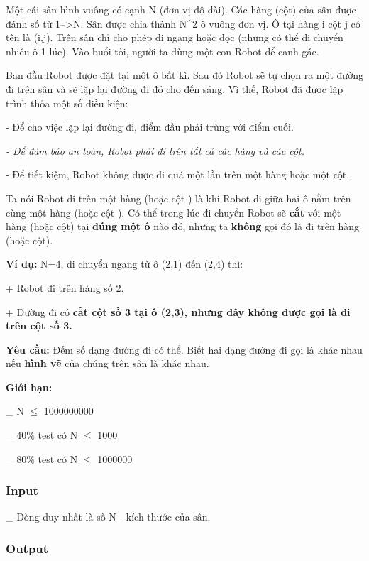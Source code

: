 



   Một cái sân hình vuông có cạnh N (đơn vị độ dài). Các hàng (cột) của sân được đánh số từ 1-->N. Sân được chia thành N^2 ô vuông đơn vị. Ô tại hàng i cột j có tên là (i,j). Trên sân chỉ cho phép đi ngang hoặc dọc (nhưng có thể di chuyển nhiều ô 1 lúc). Vào buổi tối, người ta dùng một con Robot để canh gác.  

   Ban đầu Robot được đặt tại một ô bất kì. Sau đó Robot sẽ tự chọn ra một đường đi trên sân và sẽ lặp lại đường đi đó cho đến sáng. Vì thế, Robot đã được lặp trình thỏa một số điều kiện:  

- Để cho việc lặp lại đường đi, điểm đầu phải trùng với điểm cuối.

\emph{    - Để đảm bảo an toàn, Robot phải đi trên tất cả các hàng và các cột.    
\\}

- Để tiết kiệm, Robot không được đi quá một lần trên một hàng hoặc một cột.

   Ta nói   Robot đi trên một hàng   (hoặc   cột   ) là khi Robot đi giữa   hai ô nằm trên cùng một hàng   (hoặc   cột   ). Có thể trong lúc đi chuyển Robot sẽ   \textbf{    cắt   }   với một hàng (hoặc cột) tại   \textbf{    đúng một ô   }   nào đó, nhưng ta   \textbf{    không   }   gọi đó là đi trên hàng (hoặc cột).  

\textbf{     Ví dụ:    }N=4, di chuyển ngang từ ô (2,1) đến (2,4) thì:

+ Robot đi trên hàng số 2.

+ Đường đi có    \textbf{     cắt    cột số 3 tại ô (2,3), nhưng đây    \textbf{     không    }    được gọi là đi trên cột số 3.   }

\textbf{      Yêu cầu:     }   Đếm số dạng đường đi có thể. Biết hai dạng đường đi gọi là khác nhau nếu   \textbf{    hình vẽ   }   của chúng trên sân là khác nhau.  

\textbf{      Giới hạn:     }

\_ N $\le$ 1000000000

\_ 40\% test có N $\le$ 1000

\_ 80\% test có N $\le$ 1000000

\subsubsection{   Input  }

   \_ Dòng duy nhất là số N - kích thước của sân.  

\subsubsection{   Output  }

